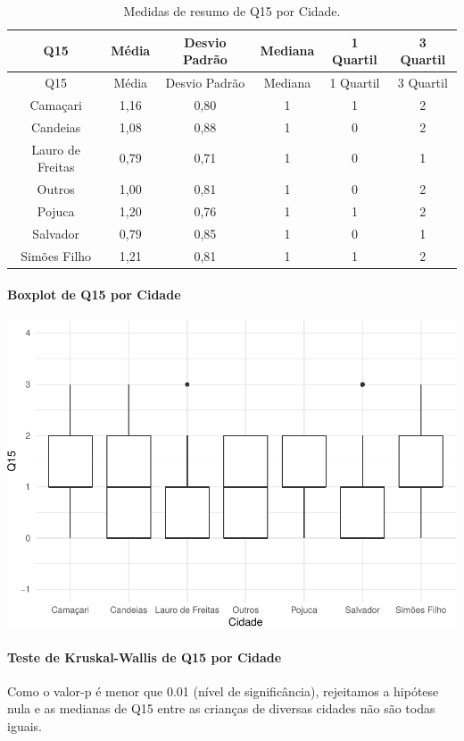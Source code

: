\documentclass[]{article}
\let\oldparagraph\paragraph
\renewcommand{\paragraph}[1]{\oldparagraph{#1}\mbox{}}
\begin{document}
\begin{longtable}[]{@{}cccccc@{}}
\caption{\label{tab:unnamed-chunk-76}Medidas de resumo de Q15 por Cidade.}\tabularnewline
\toprule
Q15 & Média & Desvio Padrão & Mediana & 1 Quartil & 3 Quartil\tabularnewline
\midrule
\endfirsthead
\toprule
Q15 & Média & Desvio Padrão & Mediana & 1 Quartil & 3 Quartil\tabularnewline
\midrule
\endhead
Camaçari & 1,16 & 0,80 & 1 & 1 & 2\tabularnewline
Candeias & 1,08 & 0,88 & 1 & 0 & 2\tabularnewline
Lauro de Freitas & 0,79 & 0,71 & 1 & 0 & 1\tabularnewline
Outros & 1,00 & 0,81 & 1 & 0 & 2\tabularnewline
Pojuca & 1,20 & 0,76 & 1 & 1 & 2\tabularnewline
Salvador & 0,79 & 0,85 & 1 & 0 & 1\tabularnewline
Simões Filho & 1,21 & 0,81 & 1 & 1 & 2\tabularnewline
\bottomrule
\end{longtable}

\hypertarget{boxplot-de-q15-por-cidade}{%
\paragraph{Boxplot de Q15 por Cidade}\label{boxplot-de-q15-por-cidade}}

\begin{center}\includegraphics[width=0.75\linewidth]{relatorio_covid19_files/figure-latex/unnamed-chunk-77-1} \end{center}

\hypertarget{teste-de-kruskal-wallis-de-q15-por-cidade}{%
\paragraph{Teste de Kruskal-Wallis de Q15 por Cidade}\label{teste-de-kruskal-wallis-de-q15-por-cidade}}

Como o valor-p é menor que 0.01 (nível de significância), rejeitamos a hipótese nula e as medianas de Q15 entre as crianças de diversas cidades não são todas iguais.
\end{document}
